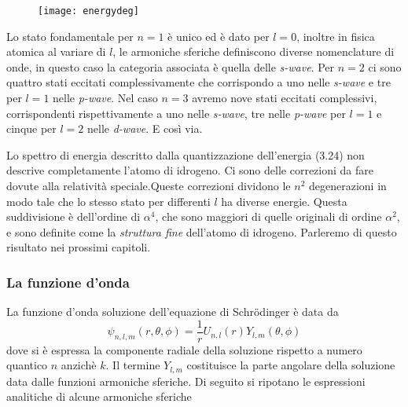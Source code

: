 \begin{figure}[!ht]
\texttt{[image: energydeg]}	
\centering
\end{figure}

\newpage

Lo stato fondamentale per $n=1$ \`e unico ed \`e dato per $l =0 $, inoltre in fisica atomica al variare di $l$, le armoniche sferiche definiscono diverse nomenclature di onde, in questo caso la categoria associata \`e quella delle \textit{s-wave}. Per $n=2$ ci sono quattro stati eccitati complessivamente che corrispondo a uno nelle \textit{s-wave} e tre per $l=1$ nelle \textit{p-wave}. Nel caso $n=3$ avremo nove stati eccitati complessivi, corrispondenti rispettivamente a uno nelle \textit{s-wave}, tre nelle \textit{p-wave} per $l=1$ e cinque per $l=2$ nelle \textit{d-wave}. E cos\`i via.
\newline

Lo spettro di energia descritto dalla quantizzazione dell'energia (3.24) non descrive completamente l'atomo di idrogeno. Ci sono delle correzioni da fare dovute alla relativit\`a speciale.Queste correzioni dividono le $n^2$ degenerazioni in modo tale che lo stesso stato per differenti $l$ ha diverse energie. Questa suddivisione \`e dell'ordine di $\alpha^4$, che sono maggiori di quelle originali di ordine $\alpha^2$, e sono definite come la \textit{struttura fine} dell'atomo di idrogeno. Parleremo di questo risultato nei prossimi capitoli.

\subsubsection{La funzione d'onda }

 La funzione d'onda soluzione dell'equazione di Schr\"odinger \`e data da 
 \begin{equation*}
 	\psi_{n,l,m}(r,\theta,\phi) = \frac{1}{r}U_{n,l}(r)Y_{l,m}(\theta,\phi) 
 \end{equation*}
dove si \`e espressa la componente radiale della soluzione rispetto a numero quantico $n$ anzich\`e $k$. Il termine $Y_{l,m}$ costituisce la parte angolare della soluzione data dalle funzioni armoniche sferiche.
Di seguito si ripotano le espressioni analitiche di alcune armoniche sferiche


